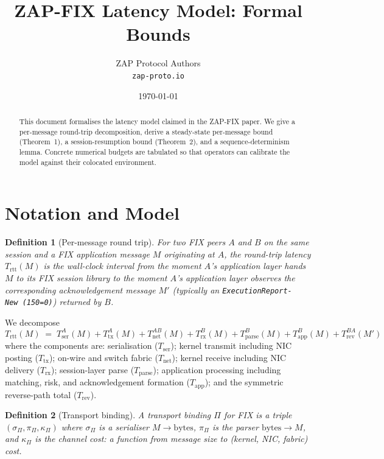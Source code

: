 \documentclass[11pt,a4paper]{article}
\title{ZAP-FIX Latency Model: Formal Bounds}
\author{ZAP Protocol Authors\\\texttt{zap-proto.io}}
\date{\today}
\newtheorem{definition}{Definition}
\begin{document}
\maketitle

\begin{abstract}
This document formalises the latency model claimed in the ZAP-FIX
paper. We give a per-message round-trip decomposition, derive a
steady-state per-message bound (Theorem~1), a session-resumption
bound (Theorem~2), and a sequence-determinism lemma. Concrete
numerical budgets are tabulated so that operators can calibrate the
model against their colocated environment.
\end{abstract}

\section{Notation and Model}
\label{sec:model}

\begin{definition}[Per-message round trip]
For two FIX peers $A$ and $B$ on the same session and a FIX
application message $M$ originating at $A$, the round-trip
latency $T_{\mathrm{rtt}}(M)$ is the wall-clock interval from the
moment $A$'s application layer hands $M$ to its FIX session library
to the moment $A$'s application layer observes the corresponding
acknowledgement message $M'$ (typically an
\texttt{ExecutionReport-New}~\texttt{(150=0)}) returned by $B$.
\end{definition}

We decompose
\begin{equation}
  T_{\mathrm{rtt}}(M)
   \;=\;
   T_{\mathrm{ser}}^A(M) + T_{\mathrm{tx}}^A(M)
   + T_{\mathrm{net}}^{AB}(M)
   + T_{\mathrm{rx}}^B(M) + T_{\mathrm{parse}}^B(M)
   + T_{\mathrm{app}}^B(M)
   + T_{\mathrm{rev}}^{BA}(M')
  \label{eq:budget}
\end{equation}
where the components are: serialisation
($T_{\mathrm{ser}}$); kernel transmit including NIC posting
($T_{\mathrm{tx}}$); on-wire and switch fabric ($T_{\mathrm{net}}$);
kernel receive including NIC delivery ($T_{\mathrm{rx}}$);
session-layer parse ($T_{\mathrm{parse}}$); application processing
including matching, risk, and acknowledgement formation
($T_{\mathrm{app}}$); and the symmetric reverse-path total
($T_{\mathrm{rev}}$).

\begin{definition}[Transport binding]
A \emph{transport binding} $\Pi$ for FIX is a triple
$(\sigma_\Pi, \pi_\Pi, \kappa_\Pi)$ where $\sigma_\Pi$ is a serialiser
$M \to \mathrm{bytes}$, $\pi_\Pi$ is the parser
$\mathrm{bytes} \to M$, and $\kappa_\Pi$ is the channel cost: a
function from message size to (kernel, NIC, fabric) cost.
\end{definition}
\end{document}
